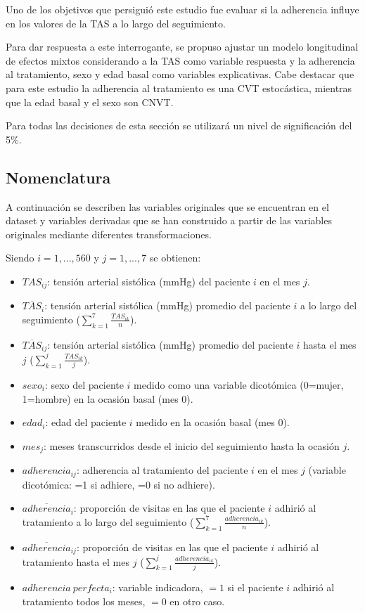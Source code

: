 \documentclass[spanish]{article}
\numberwithin{figure}{subsection}
\numberwithin{equation}{subsection}
\numberwithin{table}{subsection}
\def\npatients{560}
\begin{document}
Uno de los objetivos que persiguió este estudio fue evaluar si la adherencia
influye en los valores de la TAS a lo largo del seguimiento.

Para dar respuesta a este interrogante, se propuso ajustar un modelo
longitudinal de efectos mixtos considerando a la TAS como variable respuesta y
la adherencia al tratamiento, sexo y edad basal como variables explicativas.
Cabe destacar que para este estudio la adherencia al tratamiento es una CVT
estocástica, mientras que la edad basal y el sexo son CNVT.

Para todas las decisiones de esta sección se utilizará un nivel de significación
del 5\%.

\subsection{Nomenclatura}
\label{variables}

A continuación se describen las variables originales que se encuentran en el
dataset y variables derivadas que se han construido a partir de las variables
originales mediante diferentes transformaciones.

Siendo $ i = 1, ..., \npatients{}$ y $j = 1, ..., 7$ se obtienen:

\begin{itemize}
	\item $TAS_{ij}$: tensión arterial sistólica (mmHg) del paciente $i$ en el
	mes $j$.
	\item $\overline{TAS}_{i}$: tensión arterial sistólica (mmHg) promedio del
	paciente $i$ a lo largo del seguimiento ($\sum_{k=1}^7 \frac{TAS_{ik}}{n}$).
	\item $\overline{TAS}_{ij}$: tensión arterial sistólica (mmHg) promedio del
	paciente $i$ hasta el mes $j$ ($\sum_{k=1}^j \frac{TAS_{ik}}{j}$).
	\item $sexo_i$: sexo del paciente $i$ medido como una variable dicotómica
	(0=mujer, 1=hombre) en la ocasión basal (mes 0).
	\item $edad_i$: edad del paciente $i$ medido en la ocasión basal (mes 0).
	\item $mes_j$: meses transcurridos desde el inicio del seguimiento hasta la
	ocasión $j$.
	\item $adherencia_{ij}$: adherencia al tratamiento del paciente $i$ en el
	mes $j$ (variable dicotómica: =1 si adhiere, =0 si no adhiere).
	\item $\overline{adherencia}_i$: proporción de visitas en las que el
	paciente $i$ adhirió al tratamiento a lo largo del seguimiento
	($\sum_{k=1}^7 \frac{adherencia_{ik}}{n}$).
	\item $\overline{adherencia}_{ij}$: proporción de visitas en las que el
	paciente $i$ adhirió al tratamiento hasta el mes $j$ ($\sum_{k=1}^j
	\frac{adherencia_{ik}}{j}$).
	\item $adherencia\ perfecta_i$: variable indicadora, $=1$ si el paciente
	$i$ adhirió al tratamiento todos los meses, $=0$ en otro caso.
\end{itemize}
\end{document}
